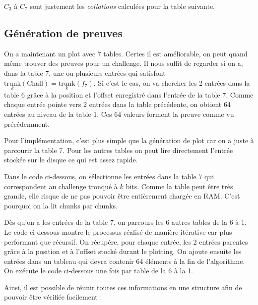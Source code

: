 $C_3$ à $C_7$ sont justement les \emph{collations} calculées pour la table suivante.

\subsection{Génération de preuves}

On a maintenant un plot avec 7 tables. Certes il est améliorable, on peut quand même trouver des preuves pour un challenge. Il nous suffit de regarder si on a, dans la table 7, une ou plusieurs entrées qui satisfont $\underset{k}{\mathrm{trunk}}(\mathrm{Chall})=\underset{k}{\mathrm{trunk}}(f_7)$. Si c'est le cas, on va chercher les 2 entrées dans la table 6 grâce à la position et l'offset enregistré dans l'entrée de la table 7. Comme chaque entrée pointe vers 2 entrées dans la table précédente, on obtient 64 entrées au niveau de la table 1. Ces 64 valeurs forment la preuve comme vu précédemment.

Pour l'implémentation, c'est plus simple que la génération de plot car on a juste à parcourir la  table 7. Pour les autres tables on peut lire directement l'entrée stockée sur le disque ce qui est assez rapide.

Dans le code ci-dessous, on sélectionne les entrées dans la table 7 qui correspondent au challenge tronqué à $k$ bits. Comme la table peut être très grande, elle risque de ne pas pouvoir être entièrement chargée en RAM. C'est pourquoi on la lit chunks par chunks.


Dès qu'on a les entrées de la table 7, on parcours les 6 autres tables de la 6 à 1. Le code ci-dessous montre le processus réalisé de manière itérative car plus performant que récursif. On récupère, pour chaque entrée, les 2 entrées parentes grâce à la position et à l'offset stocké durant le plotting. On ajoute ensuite les entrées dans un tableau qui devra contenir 64 éléments à la fin de l'algorithme. On exécute le code ci-dessous une fois par table de la 6 à la 1.


\newpage

Ainsi, il est possible de réunir toutes ces informations en une structure afin de pouvoir être vérifiée facilement :


